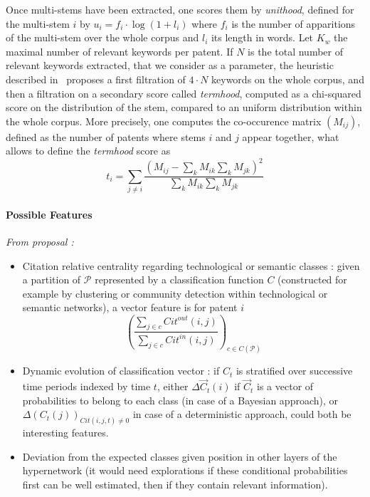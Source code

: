 Once multi-stems have been extracted, one scores them by \emph{unithood}, defined for the multi-stem $i$ by $u_i = f_i\cdot \log{(1 + l_i)}$ where $f_i$ is the number of apparitions of the multi-stem over the whole corpus and $l_i$ its length in words. Let $K_w$ the maximal number of relevant keywords per patent. If $N$ is the total number of relevant keywords extracted, that we consider as a parameter, the heuristic described in~\cite{chavalarias2013phylomemetic} proposes a first filtration of $4\cdot N$ keywords on the whole corpus, and then a filtration on a secondary score called \emph{termhood}, computed as a chi-squared score on the distribution of the stem, compared to an uniform distribution within the whole corpus. More precisely, one computes the co-occurence matrix $(M_{ij})$, defined as the number of patents where stems $i$ and $j$ appear together, what allows to define the \emph{termhood} score as
\[
t_i = \sum_{j\neq i}\frac{\left( M_{ij} - \sum_{k}M_{ik} \sum_{k} M_{jk}\right)^2}{\sum_{k}M_{ik} \sum_{k} M_{jk}}
\]











\paragraph{Possible Features}

\textit{From proposal : }

\begin{itemize}
\item Citation relative centrality regarding technological or semantic classes : given a partition of $\mathcal{P}$ represented by a classification function $C$ (constructed for example by clustering or community detection within technological or semantic networks), a vector feature is for patent $i$
\[
\left(\frac{\sum_{j\in c}Cit^{out}(i,j)}{\sum_{j\in c}Cit^{in}(i,j)}\right)_{c\in C(\mathcal{P})}
\]
\item Dynamic evolution of classification vector : if $C_t$ is stratified over successive time periods indexed by time $t$, either $\Delta \vec{C}_t (i)$ if $\vec{C}_t$ is a vector of probabilities to belong to each class (in case of a Bayesian approach), or $\Delta (C_t(j))_{Cit(i,j,t)\neq 0}$ in case of a deterministic approach, could both be interesting features.
\item Deviation from the expected classes given position in other layers of the hypernetwork (it would need explorations if these conditional probabilities first can be well estimated, then if they contain relevant information).
\end{itemize}






